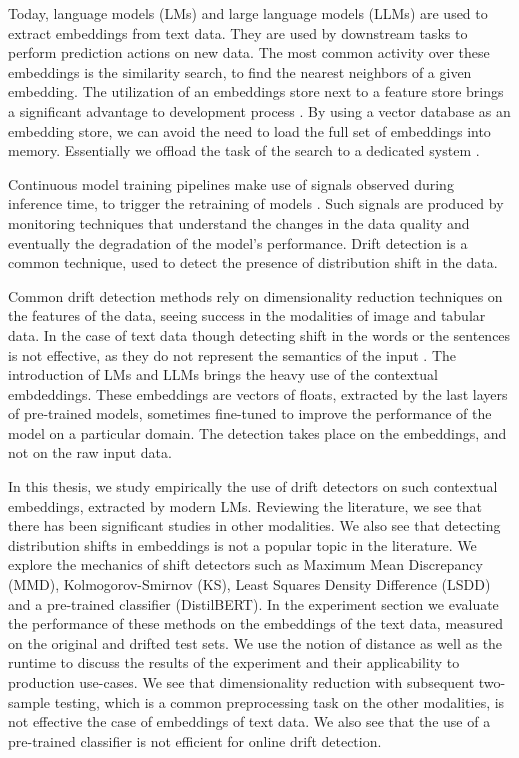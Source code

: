 \documentclass[12pt]{report}
\begin{document}
Today, language models (LMs) and large language models (LLMs) are used to extract embeddings from text data.
They are used by downstream tasks to perform prediction actions on new data.
The most common activity over these embeddings is the similarity search, to find the nearest neighbors of a given embedding.
The utilization of an embeddings store next to a feature store brings a significant advantage to development process \cite{orrManagingMLPipelines2021}.
By using a vector database as an embedding store, we can avoid the need to load the full set of embeddings into memory.
Essentially we offload the task of the search to a dedicated system \cite{wangMilvusPurposeBuiltVector2021} \cite{weiAnalyticDBVHybridAnalytical2020}.

Continuous model training pipelines make use of signals observed during inference time, to trigger the retraining of models \cite{baylorContinuousTrainingProduction2019}.
Such signals are produced by monitoring techniques \cite{papapanagiotouModelMonitoring2021} that understand the changes in the data quality \cite{schelterAutomatingLargescaleData2018a} and eventually the degradation of the model's performance.
Drift detection is a common technique, used to detect the presence of distribution shift in the data.

Common drift detection methods rely on dimensionality reduction techniques on the features of the data, seeing success in the modalities of image and tabular data.
In the case of text data though detecting shift in the words or the sentences is not effective, as they do not represent the semantics of the input \cite{ltdAlibidetectDocumentationb}.
The introduction of LMs and LLMs brings the heavy use of the contextual embdeddings.
These embeddings are vectors of floats, extracted by the last layers of pre-trained models, sometimes fine-tuned to improve the performance of the model on a particular domain.
The detection takes place on the embeddings, and not on the raw input data.

In this thesis, we study empirically the use of drift detectors on such contextual embeddings, extracted by modern LMs.
Reviewing the literature, we see that there has been significant studies \cite{rabanserFailingLoudlyEmpirical2019a} in other modalities.
We also see that detecting distribution shifts in embeddings is not a popular topic in the literature.
We explore the mechanics of shift detectors such as Maximum Mean Discrepancy (MMD), Kolmogorov-Smirnov (KS), Least Squares Density Difference (LSDD) and a pre-trained classifier (DistilBERT).
In the experiment section we evaluate the performance of these methods on the embeddings of the text data, measured on the original and drifted test sets.
We use the notion of distance as well as the runtime to discuss the results of the experiment and their applicability to production use-cases.
We see that dimensionality reduction with subsequent two-sample testing, which is a common preprocessing task on the other modalities, is not effective the case of embeddings of text data.
We also see that the use of a pre-trained classifier is not efficient for online drift detection.
\end{document}
